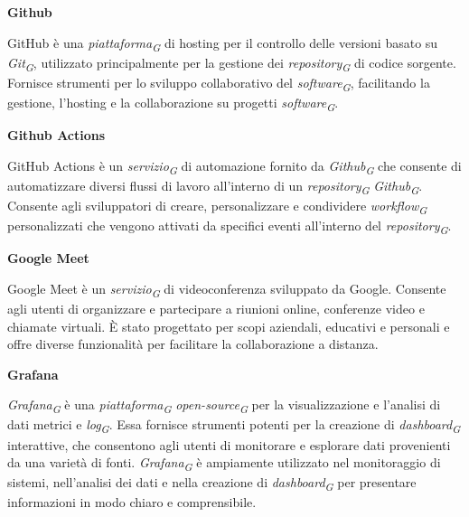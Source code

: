 \documentclass{article}
\begin{document}
\vspace{0.4cm}

\textbf{Github}

\vspace{0.1cm}

GitHub è una \textit{piattaforma}\textsubscript{\textit{G}} di hosting per il controllo delle versioni basato su \textit{Git}\textsubscript{\textit{G}}, utilizzato principalmente per la gestione dei \textit{repository}\textsubscript{\textit{G}} di codice sorgente. Fornisce strumenti per lo sviluppo collaborativo del \textit{software}\textsubscript{\textit{G}}, facilitando la gestione, l'hosting e la collaborazione su progetti \textit{software}\textsubscript{\textit{G}}.

\vspace{0.4cm}

\textbf{Github Actions}

\vspace{0.1cm}

GitHub Actions è un \textit{servizio}\textsubscript{\textit{G}} di automazione fornito da \textit{Github}\textsubscript{\textit{G}} che consente di automatizzare diversi flussi di lavoro all'interno di un \textit{repository}\textsubscript{\textit{G}} \textit{Github}\textsubscript{\textit{G}}. Consente agli sviluppatori di creare, personalizzare e condividere \textit{workflow}\textsubscript{\textit{G}} personalizzati che vengono attivati da specifici eventi all'interno del \textit{repository}\textsubscript{\textit{G}}.

\vspace{0.4cm}

\textbf{Google Meet}

\vspace{0.1cm}

Google Meet è un \textit{servizio}\textsubscript{\textit{G}} di videoconferenza sviluppato da Google. Consente agli utenti di organizzare e partecipare a riunioni online, conferenze video e chiamate virtuali. È stato progettato per scopi aziendali, educativi e personali e offre diverse funzionalità per facilitare la collaborazione a distanza. 

\vspace{0.4cm}

\textbf{Grafana}

\vspace{0.1cm}

\textit{Grafana}\textsubscript{\textit{G}} è una \textit{piattaforma}\textsubscript{\textit{G}} \textit{open-source}\textsubscript{\textit{G}} per la visualizzazione e l'analisi di dati metrici e \textit{log}\textsubscript{\textit{G}}. Essa fornisce strumenti potenti per la creazione di \textit{dashboard}\textsubscript{\textit{G}} interattive, che consentono agli utenti di monitorare e esplorare dati provenienti da una varietà di fonti. \textit{Grafana}\textsubscript{\textit{G}} è ampiamente utilizzato nel monitoraggio di sistemi, nell'analisi dei dati e nella creazione di \textit{dashboard}\textsubscript{\textit{G}} per presentare informazioni in modo chiaro e comprensibile.
\end{document}
